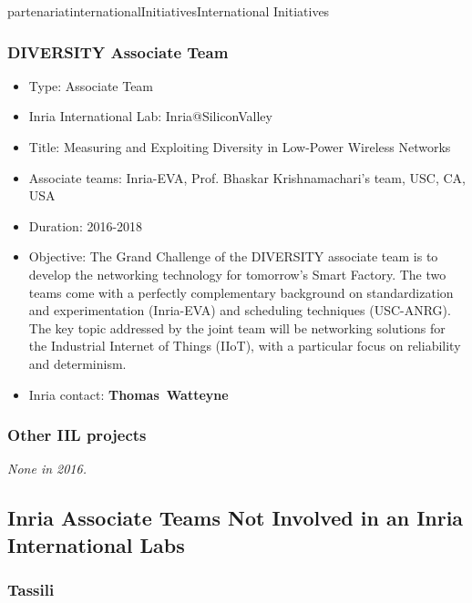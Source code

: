 \documentclass{ra2016}
\newcommand{\thomas}           {\textbf{Thomas~Watteyne}}
\begin{document}
\begin{module}{partenariat}{internationalInitiatives}{International Initiatives}
\subsubsection{DIVERSITY Associate Team}
\label{sec:diversity}

\begin{itemize}
    \item Type: Associate Team
    \item Inria International Lab: Inria@SiliconValley
    \item Title: Measuring and Exploiting Diversity in Low-Power Wireless Networks
    \item Associate teams: Inria-EVA, Prof. Bhaskar Krishnamachari's team, USC, CA, USA
    \item Duration: 2016-2018
    \item Objective:
        The Grand Challenge of the DIVERSITY associate team is to develop the networking technology for tomorrow's Smart Factory.
        The two teams come with a perfectly complementary background on standardization and experimentation (Inria-EVA) and scheduling techniques (USC-ANRG).
        The key topic addressed by the joint team will be networking solutions for the Industrial Internet of Things (IIoT), with a particular focus on reliability and determinism.
    \item Inria contact: \thomas
\end{itemize}

\subsubsection{Other IIL projects}

\textit{None in 2016.}

\subsection{Inria Associate Teams Not Involved in an Inria International Labs}

%

\subsubsection{Tassili}


\end{module}
\end{document}
